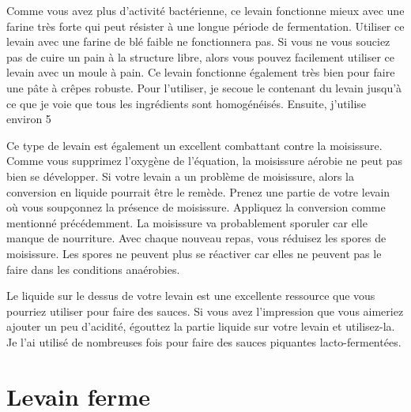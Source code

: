 Comme vous avez plus d'activité bactérienne, ce levain fonctionne mieux avec une farine très forte qui peut résister à une longue période de fermentation. Utiliser ce levain avec une farine de blé faible ne fonctionnera pas. Si vous ne vous souciez pas de cuire un pain à la structure libre, alors vous pouvez facilement utiliser ce levain avec un moule à pain. Ce levain fonctionne également très bien pour faire une pâte à crêpes robuste. Pour l'utiliser, je secoue le contenant du levain jusqu'à ce que je voie que tous les ingrédients sont homogénéisés. Ensuite, j'utilise environ 5%

Ce type de levain est également un excellent combattant contre la moisissure. Comme vous supprimez l'oxygène de l'équation, la moisissure aérobie ne peut pas bien se développer. Si votre levain a un problème de moisissure, alors la conversion en liquide pourrait être le remède. Prenez une partie de votre levain où vous soupçonnez la présence de moisissure. Appliquez la conversion comme mentionné précédemment. La moisissure va probablement sporuler car elle manque de nourriture. Avec chaque nouveau repas, vous réduisez les spores de moisissure. Les spores ne peuvent plus se réactiver car elles ne peuvent pas le faire dans les conditions anaérobies.

Le liquide sur le dessus de votre levain est une excellente ressource que vous pourriez utiliser pour faire des sauces. Si vous avez l'impression que vous aimeriez ajouter un peu d'acidité, égouttez la partie liquide sur votre levain et utilisez-la. Je l'ai utilisé de nombreuses fois pour faire des sauces piquantes lacto-fermentées.

\section{Levain ferme}
\label{section:levain-ferme}

